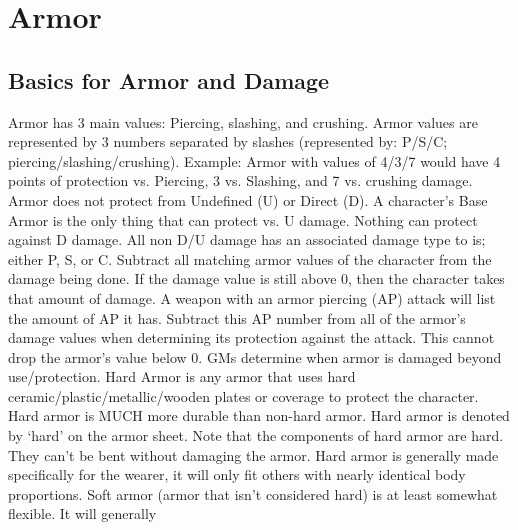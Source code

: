 \documentclass[twoside]{book}
\begin{document}
\section{Armor}
    
\subsection{Basics for Armor and Damage}
      
                  Armor has 3 main values: Piercing, slashing, and
                 crushing. Armor values are represented by 3 numbers
                 separated by slashes (represented by: P/S/C;
                 piercing/slashing/crushing). Example: Armor with values
                 of 4/3/7 would have 4 points of protection vs. Piercing,
                 3 vs. Slashing, and 7 vs. crushing damage. 
                  Armor does not protect from Undefined (U) or
                 Direct (D). 
                  A character's Base Armor is the only thing
                 that can protect vs. U damage. Nothing can protect
                 against D damage. 
                  All non D/U damage has an associated damage type
                 to is; either P, S, or C. Subtract all matching armor
                 values of the character from the damage being done. If
                 the damage value is still above 0, then the character
                 takes that amount of damage. 
                  A weapon with an armor piercing (AP) attack will
                 list the amount of AP it has. Subtract this AP number
                 from all of the armor's damage values when
                 determining its protection against the attack. This
                 cannot drop the armor's value below 0. 
                  GMs determine when armor is damaged beyond
                 use/protection. 
                  Hard Armor is any armor that uses hard
                 ceramic/plastic/metallic/wooden plates or coverage to
                 protect the character. Hard armor is MUCH more durable
                 than non-hard armor. Hard armor is denoted by
                 `hard' on the armor sheet. Note that the
                 components of hard armor are hard. They can't be
                 bent without damaging the armor. Hard armor is generally
                 made specifically for the wearer, it will only fit
                 others with nearly identical body proportions. 
                  Soft armor (armor that isn't considered
                 hard) is at least somewhat flexible. It will generally
\end{document}
